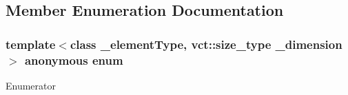 \subsection{Member Enumeration Documentation}
\hypertarget{classvct_dynamic_const_n_array_ref_ae8d52484153d181fd3ac08be58589848}{\subsubsection[{anonymous enum}]{\setlength{\rightskip}{0pt plus 5cm}template$<$class \-\_\-element\-Type, vct\-::size\-\_\-type \-\_\-dimension$>$ anonymous enum}}\label{classvct_dynamic_const_n_array_ref_ae8d52484153d181fd3ac08be58589848}
\begin{Desc}
\item[Enumerator]\par
\begin{description}
\item[{\em 
\hypertarget{classvct_dynamic_const_n_array_ref_ae8d52484153d181fd3ac08be58589848ae003ed9f88ed51f50c6c180506995b93}{D\-I\-M\-E\-N\-S\-I\-O\-N}\label{classvct_dynamic_const_n_array_ref_ae8d52484153d181fd3ac08be58589848ae003ed9f88ed51f50c6c180506995b93}
}]\end{description}
\end{Desc}


